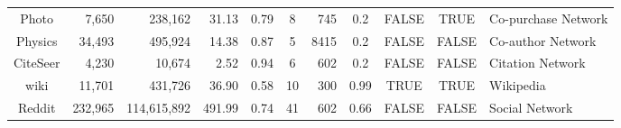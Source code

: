 \begin{table}[!htbp]
\begin{sc}
{\begin{tabular}{@{}crrrccrcccl@{}}
Photo          & 7,650     & 238,162     & 31.13  & 0.79  & 8  & 745  & 0.2  & FALSE & TRUE  & Co-purchase Network \\
Physics        & 34,493    & 495,924     & 14.38  & 0.87  & 5  & 8415 & 0.2  & FALSE & FALSE & Co-author Network   \\
CiteSeer       & 4,230     & 10,674      & 2.52   & 0.94  & 6  & 602  & 0.2  & FALSE & FALSE & Citation Network    \\
wiki           & 11,701    & 431,726     & 36.90  & 0.58  & 10 & 300  & 0.99 & TRUE  & TRUE  & Wikipedia           \\
Reddit         & 232,965   & 114,615,892 & 491.99 & 0.74  & 41 & 602  & 0.66 & FALSE & FALSE & Social Network      \\ \bottomrule
\end{tabular}
}
\end{sc}
\end{table}
